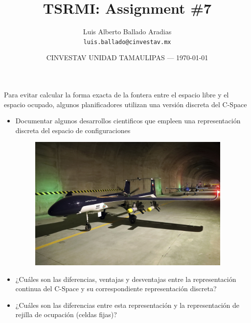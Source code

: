 \documentclass{article}
\title{TSRMI: Assignment \#7} %
\author{Luis Alberto Ballado Aradias\\ \texttt{luis.ballado@cinvestav.mx}} %
\date{CINVESTAV UNIDAD TAMAULIPAS --- \today} %
\begin{document}
\maketitle %


Para evitar calcular la forma exacta de la fontera entre el espacio libre y el espacio ocupado, algunos planificadores utilizan una versión discreta del C-Space 
\begin{itemize} %
\item {Documentar algunos desarrollos cientificos que empleen una representación discreta del espacio de configuraciones}

\begin{figure}[h]
\includegraphics[width=10cm]{images/drone_alafija.jpg}
\centering
\end{figure}

\item {¿Cuáles son las diferencias, ventajas y desventajas entre la representación continua del C-Space y su correspondiente representación discreta?}
\item {¿Cuáles son las diferencias entre esta representación y la representación de rejilla de ocupación (celdas fijas)?}

\end{itemize}
\end{document}
